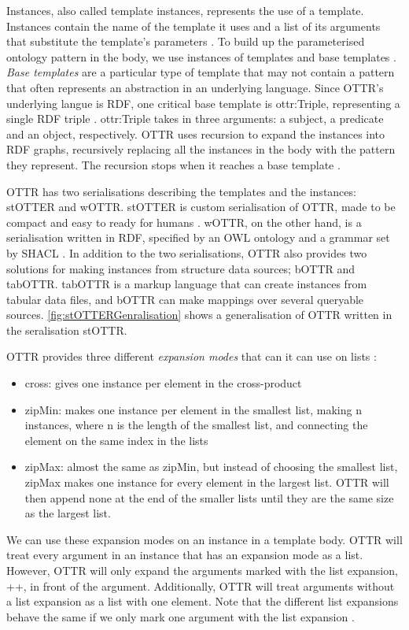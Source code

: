 \para
Instances, also called template instances, represents the use of a template.  Instances contain the name of the template it uses and a list of its arguments that substitute the template's parameters \autocite[3]{SLKK_OTTR_2021}. To build up the parameterised ontology pattern in the body, we use instances of templates and base templates \autocite[479]{SLKF_OTTR_2018}. \emph{Base templates} are a particular type of template that may not contain a pattern that often represents an abstraction in an underlying language. Since OTTR's underlying langue is RDF, one critical base template is ottr:Triple, representing a single RDF triple \autocite[4]{SLKK_OTTR_2021}. ottr:Triple takes in three arguments: a subject, a predicate and an object, respectively. OTTR uses recursion to expand the instances into RDF graphs, recursively replacing all the instances in the body with the pattern they represent. The recursion stops when it reaches a base template \autocite[479]{SLKF_OTTR_2018}.

\para
OTTR has two serialisations describing the templates and the instances: stOTTER and wOTTR. stOTTER is custom serialisation of OTTR, made to be compact and easy to ready for humans \autocite[4]{SLKK_OTTR_2021}. wOTTR, on the other hand, is a serialisation written in RDF, specified by an OWL ontology and a grammar set by SHACL \autocite{SHACL} \autocite[4]{SLKK_OTTR_2021}. In addition to the two serialisations, OTTR also provides two solutions for making instances from structure data sources; bOTTR and tabOTTR. tabOTTR is a markup language that can create instances from tabular data files, and bOTTR can make mappings over several queryable sources\autocite[16]{SLKK_OTTR_2021}. \autoref{fig:stOTTERGenralisation} shows a generalisation of OTTR written in the seralisation stOTTR.

\para
OTTR provides three different \emph{expansion modes} that can it can use on lists \autocite[8]{SLKK_OTTR_2021}:
\begin{itemize}
    \item cross: gives one instance per element in the cross-product
    \item zipMin: makes one instance per element in the smallest list, making n instances, where n is the length of the smallest list, and connecting the element on the same index in the lists
    \item zipMax: almost the same as zipMin, but instead of choosing the smallest list, zipMax makes one instance for every element in the largest list. OTTR will then append none at the end of the smaller lists until they are the same size as the largest list. 
\end{itemize}
We can use these expansion modes on an instance in a template body. OTTR will treat every argument in an instance that has an expansion mode as a list. However, OTTR will only expand the arguments marked with the list expansion, ++, in front of the argument. Additionally, OTTR will treat arguments without a list expansion as a list with one element. Note that the different list expansions behave the same if we only mark one argument with the list expansion \autocite[480]{SLKF_OTTR_2018}. 

